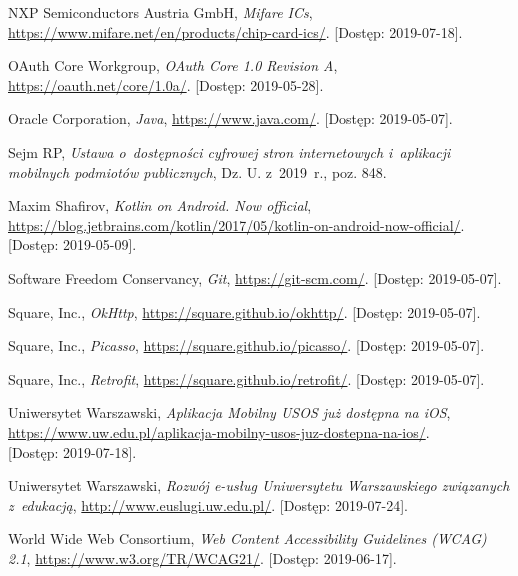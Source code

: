 \documentclass{pracamgr}
\begin{document}
\begin{thebibliography}{99}
 NXP Semiconductors Austria GmbH, \textit{Mifare ICs}, \url{https://www.mifare.net/en/products/chip-card-ics/}. [Dostęp: 2019-07-18].


 OAuth Core Workgroup, \textit{OAuth Core 1.0 Revision A}, \url{https://oauth.net/core/1.0a/}. [Dostęp: 2019-05-28].


 Oracle Corporation, \textit{Java}, \url{https://www.java.com/}. [Dostęp: 2019-05-07].


 Sejm RP, \textit{Ustawa o~dostępności cyfrowej stron internetowych i~aplikacji mobilnych podmiotów publicznych}, Dz. U. z~2019~r., poz. 848.


 Maxim Shafirov, \textit{Kotlin on Android. Now official},
\url{https://blog.jetbrains.com/kotlin/2017/05/kotlin-on-android-now-official/}. [Dostęp: 2019-05-09].


 Software Freedom Conservancy, \textit{Git},
\url{https://git-scm.com/}. [Dostęp: 2019-05-07].


 Square, Inc., \textit{OkHttp},	\url{https://square.github.io/okhttp/}. [Dostęp: 2019-05-07].

 Square, Inc., \textit{Picasso}, \url{https://square.github.io/picasso/}. [Dostęp: 2019-05-07].

 Square, Inc., \textit{Retrofit}, \url{https://square.github.io/retrofit/}. [Dostęp: 2019-05-07].


 Uniwersytet Warszawski,
\textit{Aplikacja Mobilny USOS już dostępna na iOS},\\
\url{https://www.uw.edu.pl/aplikacja-mobilny-usos-juz-dostepna-na-ios/}.\\
{[Dostęp: 2019-07-18]}.

 Uniwersytet Warszawski,
\textit{Rozwój e-usług Uniwersytetu Warszawskiego związanych z~edukacją},
\url{http://www.euslugi.uw.edu.pl/}. [Dostęp: 2019-07-24].


 World Wide Web Consortium, \textit{Web Content Accessibility Guidelines (WCAG) 2.1},
\url{https://www.w3.org/TR/WCAG21/}. [Dostęp: 2019-06-17].

\end{thebibliography}
\end{document}
